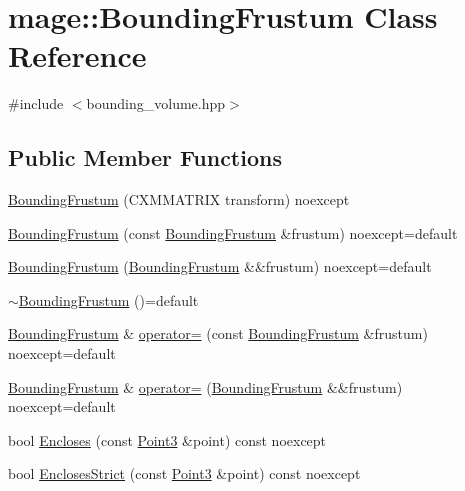\hypertarget{classmage_1_1_bounding_frustum}{}\section{mage\+:\+:Bounding\+Frustum Class Reference}
\label{classmage_1_1_bounding_frustum}


{\ttfamily \#include $<$bounding\+\_\+volume.\+hpp$>$}

\subsection*{Public Member Functions}
\begin{DoxyCompactItemize}
\item 
\mbox{\hyperlink{classmage_1_1_bounding_frustum_afafc5433abc80e872242b5488ca0c835}{Bounding\+Frustum}} (C\+X\+M\+M\+A\+T\+R\+IX transform) noexcept
\item 
\mbox{\hyperlink{classmage_1_1_bounding_frustum_a22233ec36a176312dd453bbab682c313}{Bounding\+Frustum}} (const \mbox{\hyperlink{classmage_1_1_bounding_frustum}{Bounding\+Frustum}} \&frustum) noexcept=default
\item 
\mbox{\hyperlink{classmage_1_1_bounding_frustum_a0eafed7a78a72d33a6153bdcffd07057}{Bounding\+Frustum}} (\mbox{\hyperlink{classmage_1_1_bounding_frustum}{Bounding\+Frustum}} \&\&frustum) noexcept=default
\item 
\mbox{\hyperlink{classmage_1_1_bounding_frustum_a9837a92462da6a473f6ba5b7cc3b77fb}{$\sim$\+Bounding\+Frustum}} ()=default
\item 
\mbox{\hyperlink{classmage_1_1_bounding_frustum}{Bounding\+Frustum}} \& \mbox{\hyperlink{classmage_1_1_bounding_frustum_a713509c0c2e9e947bc448e2743903c12}{operator=}} (const \mbox{\hyperlink{classmage_1_1_bounding_frustum}{Bounding\+Frustum}} \&frustum) noexcept=default
\item 
\mbox{\hyperlink{classmage_1_1_bounding_frustum}{Bounding\+Frustum}} \& \mbox{\hyperlink{classmage_1_1_bounding_frustum_ae6a344dc47b0a8dffd49fc4a95c364a5}{operator=}} (\mbox{\hyperlink{classmage_1_1_bounding_frustum}{Bounding\+Frustum}} \&\&frustum) noexcept=default
\item 
bool \mbox{\hyperlink{classmage_1_1_bounding_frustum_a5a7b074f2d78031b235f4d5f31ef683a}{Encloses}} (const \mbox{\hyperlink{structmage_1_1_point3}{Point3}} \&point) const noexcept
\item 
bool \mbox{\hyperlink{classmage_1_1_bounding_frustum_aeae9c1be8cebf662ccd6615145724dec}{Encloses\+Strict}} (const \mbox{\hyperlink{structmage_1_1_point3}{Point3}} \&point) const noexcept

\end{DoxyCompactItemize}
